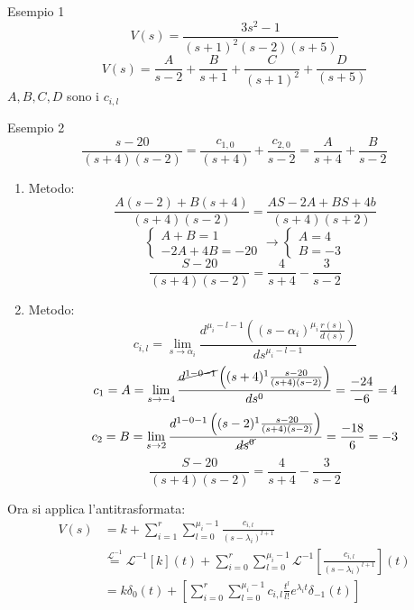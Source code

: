 \documentclass[a4paper]{article}
\begin{document}
\begin{examplebox}{Esempio 1}
    \[V(s) = \frac{3s^2 - 1}{(s+1)^2(s-2)(s+5)}\]
    \[V(s) = \frac{A}{s-2} + \frac{B}{s+1} + \frac{C}{(s+1)^2} + \frac{D}{(s+5)}\]
    $A, B, C, D$ sono i $c_{i,l}$
\end{examplebox}
\begin{examplebox}{Esempio 2}
    \[\frac{s-20}{(s+4)(s-2)} = \frac{c_{1,0}}{(s+4)} + \frac{c_{2,0}}{s-2} = \frac{A}{s+4} + \frac{B}{s-2}\]
    \begin{enumerate}
        \item Metodo: \[\frac{A(s-2)+B(s+4)}{(s+4)(s-2)} = \frac{AS - 2A + BS + 4b}{(s+4)(s+2)}\]
        \[\begin{cases}
            A + B = 1\\
            -2A + 4B = -20
        \end{cases} \rightarrow \begin{cases}
            A = 4\\
            B = -3
        \end{cases}\] 
        \[\frac{S - 20}{(s+4)(s-2)} = \frac{4}{s+4} - \frac{3}{s-2}\]
        \item Metodo: \[c_{i,l} = \lim_{s \rightarrow \alpha_i}\frac{d^{\mu_i-l-1}\left((s-\alpha_i)^{\mu_i}\frac{r(s)}{d(s)}\right)}{ds^{\mu_i-l-1}}\]
        \[c_1  =  A = \lim_{s \rightarrow -4} \frac{\cancel{d^{1-0-1}}\left((s+4)^{1}\frac{s-20}{(s+4)(s-2)}\right)}{ds^0} = \frac{-24}{-6}= 4\]
        \[c_2  =  B = \lim_{s \rightarrow 2} \frac{d^{1-0-1}\left((s-2)^{1}\frac{s-20}{(s+4)(s-2)}\right)}{\cancel{ds^0}} = \frac{-18}{6}= -3\]
        \[\frac{S - 20}{(s+4)(s-2)} = \frac{4}{s+4} - \frac{3}{s-2}\]
    \end{enumerate}
\end{examplebox}
\noindent
Ora si applica l'antitrasformata:
\begin{align*}
    V(s) &= k + \sum_{i=1}^r \sum_{l=0}^{\mu_i - 1}\frac{c_{i,l}}{(s-\lambda_i)^{l+1}}\\
    &\stackrel{\mathcal{L}^{-1}}{=} \mathcal{L}^{-1}[k](t) + \sum_{i=0}^{r}\sum_{l=0}^{\mu_i - 1} \mathcal{L}^{-1}\left[\frac{c_{i,l}}{(s-\lambda_i)^{l+1}}\right](t)\\
    &= k\delta_0(t) +  \left[\sum_{i=0}^{r}\sum_{l=0}^{\mu_i - 1} c_{i,l} \frac{t^l}{l!}e^{\lambda_i t}\delta_{-1}(t)\right]
\end{align*}
\end{document}
